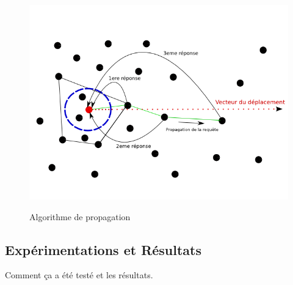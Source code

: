         \begin{figure}[!h]
        \centering
        \includegraphics[scale=0.5]{../Images/propagation_algo.png}\\
        \caption{Algorithme de propagation}
        \label{Propa_Algo}
        \end{figure}
        \vspace{1cm}
\newpage
	\subsection{Expérimentations et Résultats}
		Comment ça a été testé et les résultats.
